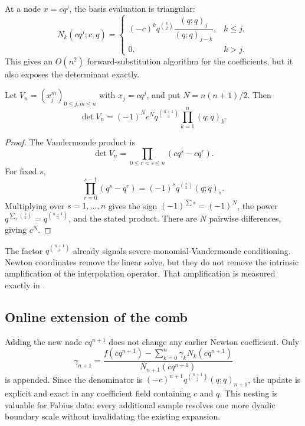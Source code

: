 At a node $x=cq^j$, the basis evaluation is triangular:
\begin{equation}
 N_k(cq^j;c,q)=
 \begin{cases}
 (-c)^kq^{\binom k2}\dfrac{(q;q)_j}{(q;q)_{j-k}},&k\le j,\\[1.1ex]
 0,&k>j.
 \end{cases}
 \label{gq:eq:newton-node-evaluation}
\end{equation}
This gives an $O(n^2)$ forward-substitution algorithm for the coefficients,
but it also exposes the determinant exactly.

\begin{theorem}
\label{gq:thm:geometric-vandermonde}
Let $V_n=(x_j^m)_{0\le j,m\le n}$ with $x_j=cq^j$, and put
$N=n(n+1)/2$.  Then
\begin{equation}
 \boxed{
 \det V_n=(-1)^N c^Nq^{\binom{n+1}{3}}
             \prod_{k=1}^n(q;q)_k.}
 \label{gq:eq:geometric-vandermonde}
\end{equation}
\end{theorem}

\begin{proof}
The Vandermonde product is
\[
 \det V_n=\prod_{0\le r<s\le n}(cq^s-cq^r).
\]
For fixed $s$,
\[
 \prod_{r=0}^{s-1}(q^s-q^r)
 =(-1)^sq^{\binom s2}(q;q)_s.
\]
Multiplying over $s=1,\ldots,n$ gives the sign
$(-1)^{\sum s}=(-1)^N$, the power
$q^{\sum_s\binom s2}=q^{\binom{n+1}{3}}$, and the stated product.  There are
$N$ pairwise differences, giving $c^N$.
\end{proof}

The factor $q^{\binom{n+1}{3}}$ already signals severe monomial-Vandermonde
conditioning.  Newton coordinates remove the linear solve, but they do not
remove the intrinsic amplification of the interpolation operator.  That
amplification is measured exactly in .

\subsection{Online extension of the comb}

Adding the new node $cq^{n+1}$ does not change any earlier Newton
coefficient.  Only
\begin{equation}
 \gamma_{n+1}
 =\frac{f(cq^{n+1})-\sum_{k=0}^n\gamma_kN_k(cq^{n+1})}
        {N_{n+1}(cq^{n+1})}
 \label{gq:eq:online-newton}
\end{equation}
is appended.  Since the denominator is
$(-c)^{n+1}q^{\binom{n+1}{2}}(q;q)_{n+1}$, the update is explicit and exact
in any coefficient field containing $c$ and $q$.  This nesting is valuable
for Fabius data: every additional sample resolves one more dyadic boundary
scale without invalidating the existing expansion.

